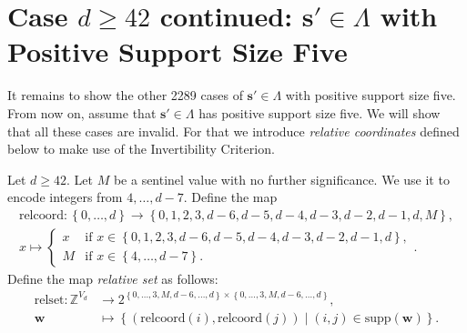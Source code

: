 \section{Case \( d \geq 42\) continued: \( \mathbf{s}' \in \Lambda\) with Positive Support Size Five}

It remains to show the other 2289 cases of \( \mathbf{s}' \in \Lambda \) with positive support size five. From now on, assume that \( \mathbf{s}' \in \Lambda \) has positive support size five. We will show that all these cases are invalid. For that we introduce \emph{relative coordinates} defined below to make use of the Invertibility Criterion.

\begin{definition}
    Let \( d \geq 42 \).
    Let \( M \) be a sentinel value with no further significance. We use it to encode integers from \( 4, \dots, d-7 \). Define the map 
    \begin{align*}
        \mathrm{relcoord}: \left\{ 0, \dots, d \right\} \to \left\{ 0,1,2,3,d-6,d-5,d-4,d-3,d-2,d-1,d,M \right\}, \\
        x \mapsto \begin{cases}
            x & \text{if } x \in \left\{ 0,1,2,3, d-6,d-5,d-4,d-3,d-2,d-1,d \right\}, \\
            M& \text{if } x \in \left\{ 4, \dots, d-7 \right\}.
        \end{cases}.
    \end{align*}
    Define the map \emph{relative set} as follows:
    \begin{align*}
        \mathrm{relset}: \mathbb{Z}^{V_d} &\to 2^{\left\{ 0, \dots, 3, M, d-6, \dots, d \right\} \times \left\{ 0, \dots, 3, M, d-6, \dots, d \right\}}, \\
        \mathbf{w} &\mapsto \left\{ (\mathrm{relcoord}(i), \mathrm{relcoord}(j)) \mid (i,j) \in \mathrm{supp}(\mathbf{w}) \right\}.
    \end{align*}
\end{definition}

